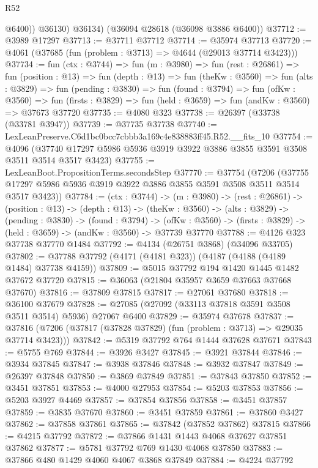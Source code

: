 \begin{lexlean}{R52}
\begin{coremodule}
            @6400))
        @36130)
      @36134)
    (@36094 @28618 (@36098 @3886 @6400))
@37712 := @3989 @17297
@37713 := @37711 @37712
@37714 := @35974 @37713
@37720 := @4061 (@37685 (fun (problem : @3713) => @4644 (@29013 @37714 @3423)))
@37734 := fun (ctx : @3744) =>
  fun (m : @3980) =>
  fun (rest : @26861) =>
  fun (position : @13) =>
  fun (depth : @13) =>
  fun (theKw : @3560) =>
  fun (alts : @3829) =>
  fun (pending : @3830) =>
  fun (found : @3794) =>
  fun (ofKw : @3560) =>
  fun (firsts : @3829) => fun (held : @3659) => fun (andKw : @3560) => @37673 @37720
@37735 := @4080 @323
@37738 := @26397 (@33738 (@33781 @3947))
@37739 := @37735 @37738
@37740 := LexLeanPreserve.C6d1bc0bcc7cbbb3a169c4e838883ff45.R52.__fits_10
@37754 := @4096
    (@37740 @17297 @5986 @5936 @3919 @3922 @3886 @3855 @3591 @3508 @3511 @3514 @3517 @3423)
@37755 := LexLeanBoot.PropositionTerms.secondsStep
@37770 := @37754
    (@7206 (@37755 @17297 @5986 @5936 @3919 @3922 @3886 @3855 @3591 @3508 @3511 @3514 @3517 @3423))
@37784 := (ctx : @3744) ->
  (m : @3980) ->
  (rest : @26861) ->
  (position : @13) ->
  (depth : @13) ->
  (theKw : @3560) ->
  (alts : @3829) ->
  (pending : @3830) ->
  (found : @3794) ->
  (ofKw : @3560) -> (firsts : @3829) -> (held : @3659) -> (andKw : @3560) -> @37739 @37770
@37788 := @4126 @323 @37738 @37770 @1484
@37792 := @4134 (@26751 @3868) (@34096 @33705)
@37802 := @37788 @37792 (@4171 (@4181 @323)) (@4187 (@4188 (@4189 @1484) @37738 @4159))
@37809 := @5015 @37792 @194 @1420 @1445 @1482 @37672 @37720
@37815 := @36063 (@21804 @35957 @3659 @37663 @37668 @37670)
@37816 := @37809 @37815
@37817 := @27061 @37680
@37818 := @36100 @37679
@37828 := @27085 (@27092 (@33113 @37818 @3591 @3508 @3511 @3514) @5936) @27067 @6400
@37829 := @35974 @37678
@37837 := @37816 (@7206 (@37817 (@37828 @37829) (fun (problem : @3713) => @29035 @37714 @3423)))
@37842 := @5319 @37792 @764 @1444 @37628 @37671
@37843 := @5755 @769
@37844 := @3926 @3427
@37845 := @3921 @37844
@37846 := @3934 @37845
@37847 := @3938 @37846
@37848 := @3932 @37847
@37849 := @26397 @37848
@37850 := @3869 @37849
@37851 := @37843 @37850
@37852 := @3451 @37851
@37853 := @4000 @27953
@37854 := @5203 @37853
@37856 := @5203 @3927 @4469
@37857 := @37854 @37856
@37858 := @3451 @37857
@37859 := @3835 @37670
@37860 := @3451 @37859
@37861 := @37860 @3427
@37862 := @37858 @37861
@37865 := @37842 (@37852 @37862) @37815
@37866 := @4215 @37792
@37872 := @37866 @1431 @1443 @4068 @37627 @37851 @37862
@37877 := @5781 @37792 @769 @1430 @4068 @37850
@37883 := @37866 @480 @1429 @4060 @4067 @3868 @37849
@37884 := @4224 @37792

\end{coremodule}
\end{lexlean}
